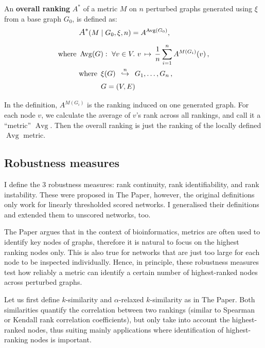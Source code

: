 \begin{definition}
    \label{def:overall_ranking}
    An \textbf{overall ranking} $A^*$ of a metric $M$ on $n$ perturbed graphs generated using $\xi$ from a base graph $G_0$, is defined as:
    \begin{align*}
        &\mathlarger{A^*}\!\left( M \mid G_0, \xi, n \right) = A^{\operatorname{Avg}(G_0)} ,\\[5pt]
        \text{where}~&\operatorname{Avg}(G) :\ \forall v \in V.\ v \,\mapsto\, \frac{1}{n} \sum_{i=1}^n A^{M(G_i)}(v)\, , \\
        &\begin{aligned}
             \text{where}~\,&\xi(G) \generates{n} G_1, \dots, G_n\,, \\
             & G = (V, E)
        \end{aligned}
    \end{align*}
\end{definition}

In the definition, $A^{M(G_i)}$ is the ranking induced on one generated graph.
For each node $v$, we calculate the average of $v$'s rank across all rankings, and call it a ``metric'' $\operatorname{Avg}$.
Then the overall ranking is just the ranking of the locally defined $\operatorname{Avg}$ metric.

\subsection{Robustness measures}\label{sec:robustness_measures}

I define the 3 robustness measures: rank continuity, rank identifiability, and rank instability.
These were proposed in The Paper, however, the original definitions only work for linearly thresholded scored networks.
I generalised their definitions and extended them to unscored networks, too.

The Paper argues that in the context of bioinformatics, metrics are often used to identify key nodes of graphs, therefore it is natural to focus on the highest ranking nodes only.
This is also true for networks that are just too large for each node to be inspected individually.
Hence, in principle, these robustness measures test how reliably a metric can identify a certain number of highest-ranked nodes across perturbed graphs.

Let us first define $k$-similarity and $\alpha$-relaxed $k$-similarity as in The Paper.
Both similarities quantify the correlation between two rankings (similar to Spearman or Kendall rank correlation coefficients), but only take into account the highest-ranked nodes, thus suiting mainly applications where identification of highest-ranking nodes is important.

